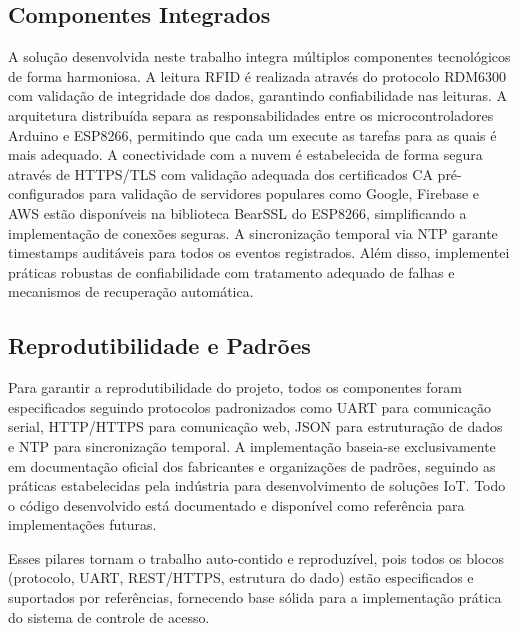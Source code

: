 \subsection{Componentes Integrados}

A solução desenvolvida neste trabalho integra múltiplos componentes tecnológicos de forma harmoniosa. A leitura RFID é realizada através do protocolo RDM6300 com validação de integridade dos dados, garantindo confiabilidade nas leituras. A arquitetura distribuída separa as responsabilidades entre os microcontroladores Arduino e ESP8266, permitindo que cada um execute as tarefas para as quais é mais adequado. A conectividade com a nuvem é estabelecida de forma segura através de HTTPS/TLS com validação adequada dos certificados CA pré-configurados para validação de servidores populares como Google, Firebase e AWS estão disponíveis na biblioteca BearSSL do ESP8266, simplificando a implementação de conexões seguras. A sincronização temporal via NTP garante timestamps auditáveis para todos os eventos registrados. Além disso, implementei práticas robustas de confiabilidade com tratamento adequado de falhas e mecanismos de recuperação automática.

\subsection{Reprodutibilidade e Padrões}

Para garantir a reprodutibilidade do projeto, todos os componentes foram especificados seguindo protocolos padronizados como UART para comunicação serial, HTTP/HTTPS para comunicação web, JSON para estruturação de dados e NTP para sincronização temporal. A implementação baseia-se exclusivamente em documentação oficial dos fabricantes e organizações de padrões, seguindo as práticas estabelecidas pela indústria para desenvolvimento de soluções IoT. Todo o código desenvolvido está documentado e disponível como referência para implementações futuras.

Esses pilares tornam o trabalho auto-contido e reproduzível, pois todos os blocos (protocolo, UART, REST/HTTPS, estrutura do dado) estão especificados e suportados por referências, fornecendo base sólida para a implementação prática do sistema de controle de acesso.


